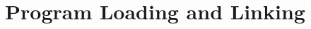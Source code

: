 \documentclass[english,11pt,twoside,toc=bib,toc=idx]{scrreprt}
\newcommand{\ARCH}{z/\kern-1pt Ar\-chi\-tec\-ture}
\newcommand{\ARCH}{ESA/390}
\begin{document}
\chapter{Program Loading and Linking}


\end{document}
